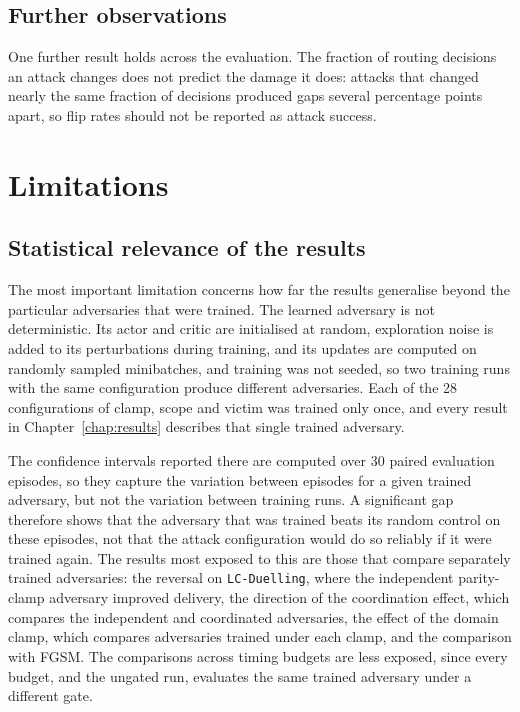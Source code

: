 \subsection{Further observations}
\label{subsec:conclusions_other}

One further result holds across the evaluation. The fraction of routing decisions an
attack changes does not predict the damage it does: attacks that changed nearly the same
fraction of decisions produced gaps several percentage points apart, so flip rates should
not be reported as attack success.

\section{Limitations}
\label{sec:limitations}

\subsection{Statistical relevance of the results}
\label{subsec:limitations_statistics}

The most important limitation concerns how far the results generalise beyond the
particular adversaries that were trained. The learned adversary is not deterministic.
Its actor and critic are initialised at random, exploration noise is added to its
perturbations during training, and its updates are computed on randomly sampled
minibatches, and training was not seeded, so two training runs with the same
configuration produce different adversaries. Each of the 28 configurations of clamp,
scope and victim was trained only once, and every result in Chapter~\ref{chap:results}
describes that single trained adversary.

The confidence intervals reported there are computed over 30 paired evaluation episodes,
so they capture the variation between episodes for a given trained adversary, but not
the variation between training runs. A significant gap therefore shows that the adversary
that was trained beats its random control on these episodes, not that the attack
configuration would do so reliably if it were trained again. The results most exposed to
this are those that compare separately trained adversaries: the reversal on
\texttt{LC-Duelling}, where the independent parity-clamp adversary improved delivery, the
direction of the coordination effect, which compares the independent and coordinated
adversaries, the effect of the domain clamp, which compares adversaries trained under
each clamp, and the comparison with FGSM. The comparisons across timing budgets are less
exposed, since every budget, and the ungated run, evaluates the same trained adversary
under a different gate.


